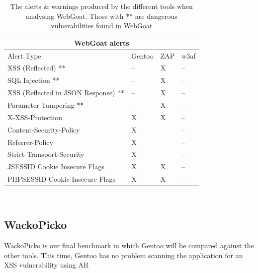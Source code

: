 \begin{table}[h]
	
	{
		
		\captionsetup{justification=centering}
		
		\caption{The alerts \& warnings produced by the different tools when analysing WebGoat. Those with ** are dangerous vulnerabilities found in WebGoat}
		\label{table:webgoat_alerts}
		\begin{tabular}{ |p{7cm}|>{\centering\arraybackslash}m{2cm} |>{\centering\arraybackslash}m{2cm} |>{\centering\arraybackslash}m{2cm}| }
			\hline
			\multicolumn{4}{|c|}{\textbf{WebGoat alerts}} \\ [0.5ex]
			\hline \hline 
			Alert Type & Gentoo & ZAP & w3af \\
			\hline
			XSS (Reflected) ** & -- & X & --\\	
			SQL Injection **& -- & X & --\\
			XSS (Reflected in JSON Response) ** & -- & X & -- \\
			Parameter Tampering **& -- & X & --\\
			X-XSS-Protection & X & X & --\\
			Content-Security-Policy & X & &-- \\
			Referrer-Policy & X & & --\\
			Strict-Transport-Security & X  & & --\\
			JSESSID Cookie Insecure Flags & X & X & -- \\
			PHPSESSID Cookie Insecure Flags & X & X & -- \\
			\hline
		\end{tabular}
	} \\
\end{table}


\subsection{WackoPicko}

WackoPicko is our final benchmark in which Gentoo will be compared against the other tools. This time, Gentoo has no problem scanning the application for an XSS vulnerability using AR 

